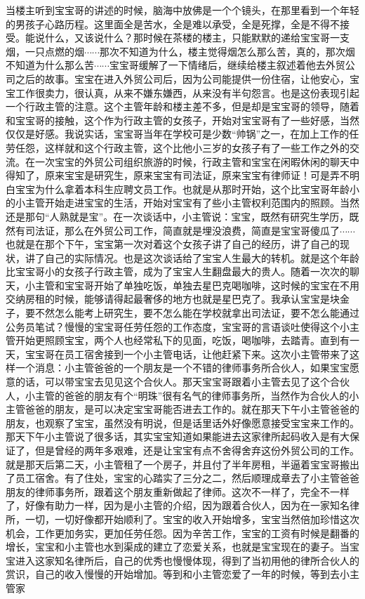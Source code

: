 当楼主听到宝宝哥的讲述的时候，脑海中放佛是一个个镜头，在那里看到一个年轻的男孩子心路历程。这里面全是苦水，全是难以承受，全是死撑，全是不得不接受。能说什么，又该说什么？那时候在茶楼的楼主，只能默默的递给宝宝哥一支烟，一只点燃的烟$\cdots\cdots$那次不知道为什么，楼主觉得烟怎么那么苦，真的，那次烟不知道为什么那么苦$\cdots\cdots$宝宝哥缓解了一下情绪后，继续给楼主叙述着他去外贸公司之后的故事。宝宝在进入外贸公司后，因为公司能提供一份住宿，让他安心，宝宝工作很卖力，很认真，从来不嫌东嫌西，从来没有半句怨言。也是这份表现引起一个行政主管的注意。这个主管年龄和楼主差不多，但是却是宝宝哥的领导，随着和宝宝哥的接触，这个作为行政主管的女孩子，开始对宝宝哥有了一些好感，当然仅仅是好感。我说实话，宝宝哥当年在学校可是少数“帅锅”之一，在加上工作的任劳任怨，这样就和这个行政主管，这个比他小三岁的女孩子有了一些工作之外的交流。在一次宝宝的外贸公司组织旅游的时候，行政主管和宝宝在闲暇休闲的聊天中得知了，原来宝宝是研究生，原来宝宝有司法证，原来宝宝有律师证！可是弄不明白宝宝为什么拿着本科生应聘文员工作。也就是从那时开始，这个比宝宝哥年龄小的小主管开始走进宝宝的生活，开始对宝宝有了些小主管权利范围内的照顾。当然还是那句“人熟就是宝”。在一次谈话中，小主管说：宝宝，既然有研究生学历，既然有司法证，那么在外贸公司工作，简直就是埋没浪费，简直是宝宝哥傻瓜了$\cdots\cdots$也就是在那个下午，宝宝第一次对着这个女孩子讲了自己的经历，讲了自己的现状，讲了自己的实际情况。也是这次谈话给了宝宝人生最大的转机。就是这个年龄比宝宝哥小的女孩子行政主管，成为了宝宝人生翻盘最大的贵人。随着一次次的聊天，小主管和宝宝哥开始了单独吃饭，单独去星巴克喝咖啡，这时候的宝宝在不用交纳房租的时候，能够请得起最奢侈的地方也就是星巴克了。我承认宝宝是块金子，要不然怎么能考上研究生，要不怎么能在学校就拿出司法证，要不怎么能通过公务员笔试？慢慢的宝宝哥任劳任怨的工作态度，宝宝哥的言语谈吐使得这个小主管开始更照顾宝宝，两个人也经常私下的见面，吃饭，喝咖啡，去踏青。直到有一天，宝宝哥在员工宿舍接到一个小主管电话，让他赶紧下来。这次小主管带来了这样一个消息：小主管爸爸的一个朋友是一个不错的律师事务所合伙人，如果宝宝愿意的话，可以带宝宝去见见这个合伙人。那天宝宝哥跟着小主管去见了这个合伙人，小主管的爸爸的朋友有个“明珠”很有名气的律师事务所，当然作为合伙人的小主管爸爸的朋友，是可以决定宝宝哥能否进去工作的。就在那天下午小主管爸爸的朋友，也观察了宝宝，虽然没有明说，但是话里话外好像愿意接受宝宝来工作的。那天下午小主管说了很多话，其实宝宝知道如果能进去这家律所起码收入是有大保证了，但是曾经的两年多艰难，还是让宝宝有点不舍得舍弃这份外贸公司的工作。就是那天后第二天，小主管租了一个房子，并且付了半年房租，半逼着宝宝哥搬出了员工宿舍。有了住处，宝宝的心踏实了三分之二，然后顺理成章去了小主管爸爸朋友的律师事务所，跟着这个朋友重新做起了律师。这次不一样了，完全不一样了，好像有助力一样，因为是小主管的介绍，因为跟着合伙人，因为在一家知名律所，一切，一切好像都开始顺利了。宝宝的收入开始增多，宝宝当然倍加珍惜这次机会，工作更加务实，更加任劳任怨。因为辛苦工作，宝宝的工资有时候是翻番的增长，宝宝和小主管也水到渠成的建立了恋爱关系，也就是宝宝现在的妻子。当宝宝进入这家知名律所后，自己的优秀也慢慢体现，得到了当初用他的律所合伙人的赏识，自己的收入慢慢的开始增加。等到和小主管恋爱了一年的时候，等到去小主管家
